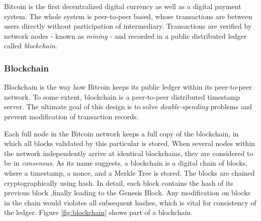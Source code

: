 \documentclass[12pt]{article}
\begin{document}
Bitcoin is the first decentralized digital currency as well as a digital payment system. The whole system is peer-to-peer based, whose transactions are between users directly without participation of intermediary. Transactions are verified by network nodes - known as \textit{mining} - and recorded in a public distributed ledger called \textit{blockchain}.

\subsubsection{Blockchain}

Blockchain is the way how Bitcoin keeps its public ledger within its peer-to-peer network. To some extent, blockchain is a peer-to-peer distributed timestamp server. The ultimate goal of this design is to solve \textit{double-spending} problems and prevent modification of transaction records\cite{nakamoto2008bitcoin}. 

Each full node in the Bitcoin network keeps a full copy of the blockchain, in which all blocks validated by this particular is stored. When several nodes within the network independently arrive at identical blockchains, they are considered to be in \textit{consensus}. As its name suggests, a blockchain is a digital chain of blocks, where a timestamp, a nonce, and a Merkle Tree is stored.  The blocks are chained cryptographically using hash. In detail, each block contains the hash of its previous block ,finally leading to the Genesis Block. Any modification on blocks in the chain would violates all subsequent hashes, which is vital for consistency of the ledger. Figure \ref{fig:blockchain} shows part of a blockchain. 
\end{document}
